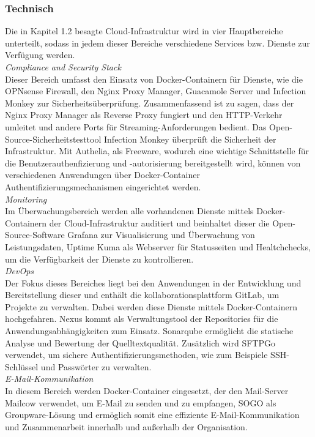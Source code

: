 \subsubsection{Technisch}
\label{sec:Technisch}
Die in Kapitel 1.2 besagte Cloud-Infrastruktur wird in vier  
Hauptbereiche unterteilt, sodass in jedem dieser Bereiche verschiedene Services bzw. 
Dienste zur Verfügung werden.
\\\textit{Compliance and Security Stack}
\\Dieser Bereich umfasst den Einsatz von Docker-Containern für Dienste, wie die OPNsense Firewall, 
den Nginx Proxy Manager, Guacamole Server und Infection Monkey zur Sicherheitsüberprüfung. 
Zusammenfassend ist zu sagen, dass der Nginx Proxy Manager als Reverse Proxy fungiert und den HTTP-Verkehr 
umleitet und andere Ports für Streaming-Anforderungen bedient. Das Open-Source-Sicherheitstesttool 
Infection Monkey überprüft die Sicherheit der Infrastruktur. Mit Authelia, als Freeware, wodurch eine wichtige 
Schnittstelle für die Benutzerauthenfizierung und -autorisierung bereitgestellt wird, können von verschiedenen 
Anwendungen über Docker-Container Authentifizierungsmechanismen eingerichtet werden.
\\\textit{Monitoring}
\\Im Überwachungsbereich werden alle vorhandenen Dienste mittels Docker-Containern der Cloud-Infrastruktur auditiert 
und beinhaltet dieser die Open-Source-Software Grafana zur Visualisierung und Überwachung von Leistungsdaten, 
Uptime Kuma als Webserver für Statusseiten und Healtchchecks, um die Verfügbarkeit der Dienste zu kontrollieren. 
\\\textit{DevOps}
\\Der Fokus dieses Bereiches liegt bei den Anwendungen in der Entwicklung und Bereitstellung dieser und enthält die 
kollaborationsplattform GitLab, um Projekte zu verwalten. Dabei werden diese Dienste mittels Docker-Containern hochgefahren. 
Nexus kommt als Verwaltungstool der Repositories für die Anwendungsabhängigkeiten zum Einsatz. Sonarqube ermöglicht die 
statische Analyse und Bewertung der Quelltextqualität. Zusätzlich wird SFTPGo verwendet, um sichere Authentifizierungsmethoden, 
wie zum Beispiele SSH-Schlüssel und Passwörter zu verwalten.
\\\textit{E-Mail-Kommunikation}
\\In diesem Bereich werden Docker-Container eingesetzt, der den Mail-Server Mailcow verwendet, um E-Mail zu senden und 
zu empfangen, SOGO als Groupware-Lösung und ermöglich somit eine effiziente E-Mail-Kommunikation und Zusammenarbeit innerhalb 
und außerhalb der Organisation.
